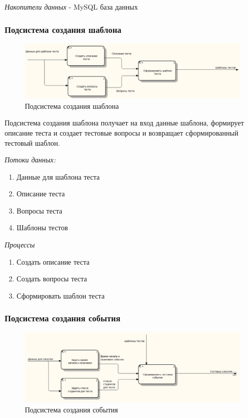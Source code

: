 \textit{Накопители данных} - MySQL база данных


\subsubsection{Подсистема создания шаблона}
\begin{figure}[H]
    \includegraphics[width=\textwidth, center]{../img/dfd/Subsystem_Template.png}
    \caption{Подсистема создания шаблона}
\end{figure}

Подсистема создания шаблона получает на вход данные шаблона, формирует описание теста
и создает тестовые вопросы и возвращает сформированный тестовый шаблон.

\textit{Потоки данных:}
\begin{enumerate}
    \item Данные для шаблона теста
    \item Описание теста
    \item Вопросы теста
    \item Шаблоны тестов
\end{enumerate}


\textit{Процессы}
\begin{enumerate}
    \item Создать описание теста
    \item Создать вопросы теста
    \item Сформировать шаблон теста
\end{enumerate}


\subsubsection{Подсистема создания события}
\begin{figure}[H]
    \includegraphics[width=\textwidth, center]{../img/dfd/Subsystem_Instance.png}
    \caption{Подсистема создания события}
\end{figure}

